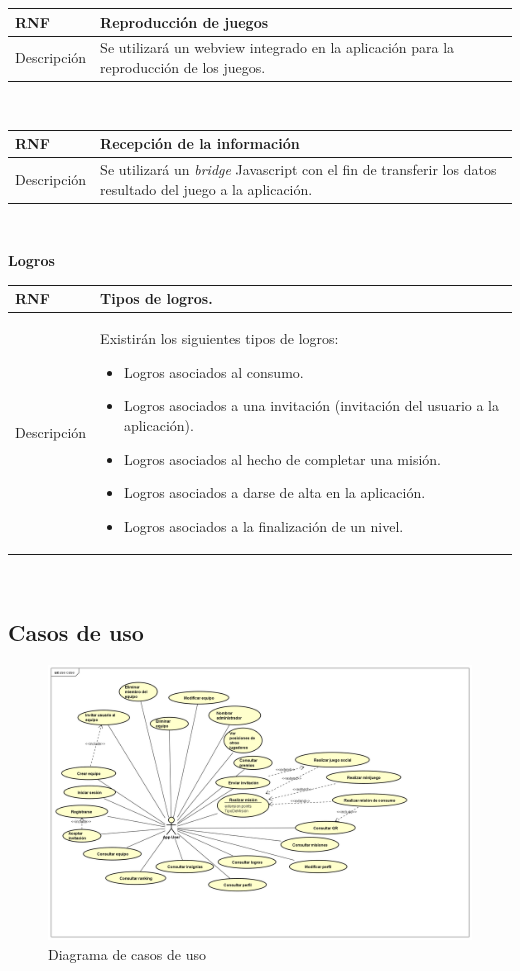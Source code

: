 \documentclass[twoside]{report}
\newcommand\addrow[2]{#1 &#2\\ }
\newcommand\addheading[2]{#1 &#2\\ \hline}
\newcommand\tabularhead{\begin{tabular}{lp{0.7\textwidth}}
\hline
}
\newenvironment{req}{\tabularhead}
{\hline\end{tabular}}
\begin{document}
\begin{req}
	\addheading{\textbf{RNF\arabic{nonFunctionalRequirements}}}{Reproducción de juegos}
	\addrow{Descripción}{Se utilizará un webview integrado en la aplicación para la reproducción de los juegos.}
\end{req}\\

\begin{req}
	\addheading{\textbf{RNF\arabic{nonFunctionalRequirements}}}{Recepción de la información}
	\addrow{Descripción}{Se utilizará un \textit{bridge} Javascript con el fin de transferir los datos resultado del juego a la aplicación.}
\end{req}\\

\textbf{Logros}\\

\begin{req}
	\addheading{\textbf{RNF\arabic{nonFunctionalRequirements}}}{Tipos de logros.}
	\addrow{Descripción}{Existirán los siguientes tipos de logros:
	\begin{itemize}
	\item Logros asociados al consumo.
	\item Logros asociados a una invitación (invitación del usuario a la aplicación).
	\item Logros asociados al hecho de completar una misión.
	\item Logros asociados a darse de alta en la aplicación.
	\item Logros asociados a la finalización de un nivel.
	\end{itemize}}
\end{req}\\

\subsection{Casos de uso}

\begin{figure}[H]
\begin{center}
\includegraphics[angle=90,scale=0.47]{images/usecase.png}
\caption{Diagrama de casos de uso}
\end{center}
\end{figure}
\end{document}
